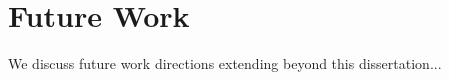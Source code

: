 \section{Future Work}
\label{sec:conclusion:future-work}

We discuss future work directions extending beyond this dissertation...
